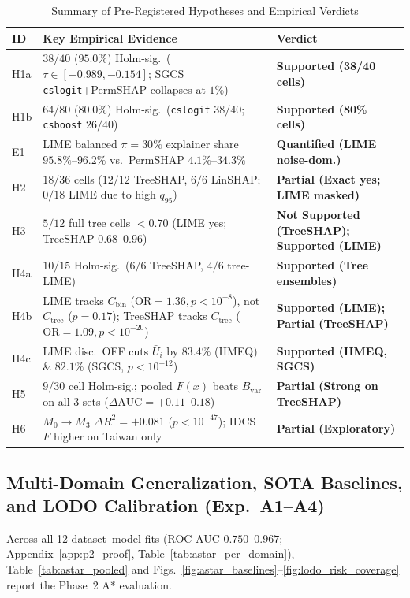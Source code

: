 \documentclass[conference]{IEEEtran}
\begin{document}
\begin{table}[!t]
\centering
\caption{Summary of Pre-Registered Hypotheses and Empirical Verdicts}
\label{tab:hypotheses_summary}
\scriptsize
\renewcommand{\arraystretch}{0.77}
\setlength{\tabcolsep}{2.4pt}
\begin{tabular}{@{}p{0.8cm}p{4.3cm}p{2.9cm}@{}}
\toprule
\textbf{ID} & \textbf{Key Empirical Evidence} & \textbf{Verdict} \\
\midrule
H1a & $38/40$ ($95.0\%$) Holm-sig.\ ($\tau \in [-0.989, -0.154]$; SGCS \texttt{cslogit}+PermSHAP collapses at $1\%$) & \textbf{Supported (38/40 cells)} \\
H1b & $64/80$ ($80.0\%$) Holm-sig.\ (\texttt{cslogit} $38/40$; \texttt{csboost} $26/40$) & \textbf{Supported (80\% cells)} \\
E1 & LIME balanced $\pi{=}30\%$ explainer share $95.8\%$--$96.2\%$ vs.\ PermSHAP $4.1\%$--$34.3\%$ & \textbf{Quantified (LIME noise-dom.)} \\
H2 & $18/36$ cells ($12/12$ TreeSHAP, $6/6$ LinSHAP; $0/18$ LIME due to high $q_{95}$) & \textbf{Partial (Exact yes; LIME masked)} \\
H3 & $5/12$ full tree cells $<0.70$ (LIME yes; TreeSHAP $0.68$--$0.96$) & \textbf{Not Supported (TreeSHAP); Supported (LIME)} \\
H4a & $10/15$ Holm-sig.\ ($6/6$ TreeSHAP, $4/6$ tree-LIME) & \textbf{Supported (Tree ensembles)} \\
H4b & LIME tracks $C_{\mathrm{bin}}$ ($\mathrm{OR}{=}1.36, p{<}10^{-8}$), not $C_{\mathrm{tree}}$ ($p{=}0.17$); TreeSHAP tracks $C_{\mathrm{tree}}$ ($\mathrm{OR}{=}1.09, p{<}10^{-20}$) & \textbf{Supported (LIME); Partial (TreeSHAP)} \\
H4c & LIME disc.\ OFF cuts $\bar{U}_i$ by $83.4\%$ (HMEQ) \& $82.1\%$ (SGCS, $p{<}10^{-12}$) & \textbf{Supported (HMEQ, SGCS)} \\
H5 & $9/30$ cell Holm-sig.; pooled $F(x)$ beats $B_{\mathrm{var}}$ on all 3 sets ($\Delta\mathrm{AUC}{=}{+}0.11$--$0.18$) & \textbf{Partial (Strong on TreeSHAP)} \\
H6 & $M_0{\to}M_3$ $\Delta R^2{=}{+}0.081$ ($p{<}10^{-47}$); IDCS $F$ higher on Taiwan only & \textbf{Partial (Exploratory)} \\
\bottomrule
\end{tabular}
\end{table}

\subsection{Multi-Domain Generalization, SOTA Baselines, and LODO Calibration (Exp.~A1--A4)}
\label{sec:res_astar}
Across all 12 dataset--model fits (ROC-AUC $0.750$--$0.967$; Appendix~\ref{app:p2_proof}, Table~\ref{tab:astar_per_domain}), Table~\ref{tab:astar_pooled} and Figs.~\ref{fig:astar_baselines}--\ref{fig:lodo_risk_coverage} report the Phase~2 A* evaluation.
\end{document}
